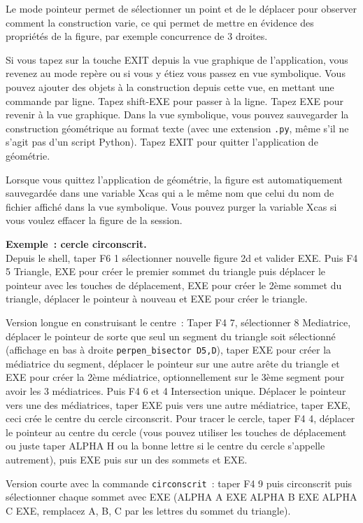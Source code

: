 \documentclass{article}
\begin{document}
\begin{giacjshere}
Le mode pointeur permet de sélectionner un point et de le
déplacer pour observer comment la construction varie, ce qui permet
de mettre en évidence des propriétés de la figure, par exemple concurrence
de 3 droites.

Si vous tapez sur la touche EXIT depuis la vue graphique
de l'application, vous revenez au mode repère ou si vous y étiez
vous passez en vue symbolique. Vous pouvez ajouter
des objets à la construction depuis cette vue, en mettant une commande
par ligne. Tapez shift-EXE pour passer à la ligne. Tapez EXE
pour revenir à la vue graphique. Dans la vue symbolique, vous
pouvez sauvegarder la construction géométrique au format texte
(avec une extension \verb|.py|, même s'il ne s'agit pas
d'un script Python).
Tapez EXIT pour quitter l'application de géométrie.

Lorsque vous quittez l'application de géométrie,
la figure est automatiquement sauvegardée
dans une variable Xcas qui a le même nom que celui du nom de fichier
affiché dans la vue symbolique. Vous pouvez purger la variable Xcas
si vous voulez effacer la figure de la session.

{\bf Exemple~: cercle circonscrit.}\\
Depuis le shell, taper F6 1 sélectionner nouvelle figure 2d et valider EXE.
Puis F4 5 Triangle, EXE pour créer le premier sommet du triangle
puis déplacer le pointeur avec les touches de déplacement, EXE pour créer
le 2ème sommet du triangle, déplacer le pointeur à nouveau et EXE
pour créer le triangle.

Version longue en construisant le centre~:
Taper F4 7, sélectionner 8 Mediatrice, déplacer
le pointeur de sorte que seul un segment du triangle
soit sélectionné (affichage
en bas à droite \verb|perpen_bisector D5,D|),
taper EXE pour créer la médiatrice du segment, déplacer le pointeur
sur une autre arête du triangle et EXE pour créer la 2ème médiatrice,
optionnellement sur le 3ème segment pour avoir les 3 médiatrices.
Puis F4 6 et 4 Intersection unique. Déplacer le pointeur vers
une des médiatrices, taper EXE puis vers une autre médiatrice, taper EXE,
ceci crée le centre du cercle circonscrit. Pour tracer le cercle,
taper F4 4, déplacer le pointeur au centre du cercle (vous pouvez
utiliser les touches de déplacement ou juste taper
ALPHA H ou la bonne lettre si le centre du cercle s'appelle autrement),
puis EXE puis sur un des sommets et EXE.

Version courte avec la commande \verb|circonscrit|~:
taper F4 9 puis circonscrit puis sélectionner chaque
sommet avec EXE (ALPHA A EXE ALPHA B EXE ALPHA C EXE, remplacez A, B, C
par les lettres du sommet du triangle).


\end{giacjshere}
\end{document}
